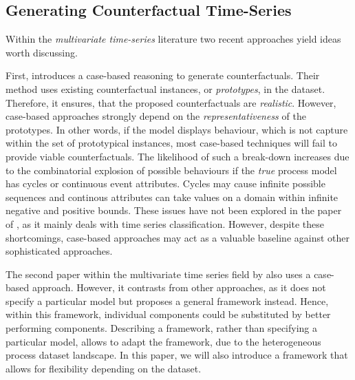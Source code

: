 \documentclass[./../../paper.tex]{subfiles}
\begin{document}
\subsection{Generating Counterfactual Time-Series}
Within the \emph{multivariate time-series} literature two recent approaches yield ideas worth discussing.

First, \citeauthor{delaney_InstanceBasedCounterfactualExplanations_2021} introduces a case-based reasoning to generate counterfactuals\autocite{delaney_InstanceBasedCounterfactualExplanations_2021}. Their method uses existing counterfactual instances, or \emph{prototypes}, in the dataset. Therefore, it ensures, that the proposed counterfactuals are \emph{realistic}. However, case-based approaches strongly depend on the \emph{representativeness} of the prototypes\needscite{}. In other words, if the model displays behaviour, which is not capture within the set of prototypical instances, most case-based techniques will fail to provide viable counterfactuals. The likelihood of such a break-down increases due to the combinatorial explosion of possible behaviours if the \emph{true} process model has cycles or continuous event attributes. Cycles may cause infinite possible sequences and continous attributes can take values on a domain within infinite negative and positive bounds. These issues have not been explored in the paper of \citeauthor{delaney_InstanceBasedCounterfactualExplanations_2021}, as it mainly deals with time series classification\needscite{}. However, despite these shortcomings, case-based approaches may act as a valuable baseline against other sophisticated approaches.

The second paper within the multivariate time series field by \citeauthor{ates_CounterfactualExplanationsMultivariate_2021} also uses a case-based approach\autocite{ates_CounterfactualExplanationsMultivariate_2021}. However, it contrasts from other approaches, as it does not specify a particular model but proposes a general framework instead. Hence, within this framework, individual components could be substituted by better performing components. Describing a framework, rather than specifying a particular model, allows to adapt the framework, due to the heterogeneous process dataset landscape. In this paper, we will also introduce a framework that allows for flexibility depending on the dataset. 
\end{document}
